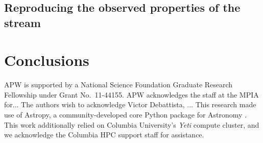 \documentclass[letterpaper,12pt,preprint]{aastex}
\begin{document}
\subsection{Reproducing the observed properties of the stream}\label{sec:results2}

\section{Conclusions}\label{sec:conclusions}


\acknowledgements
APW is supported by a National Science Foundation Graduate Research Fellowship under Grant No.\ 11-44155.
APW acknowledges the staff at the MPIA for...
The authors wish to acknowledge Victor Debattista, ...
This research made use of Astropy, a community-developed core Python package for Astronomy \citep{astropy13}.
This work additionally relied on Columbia University's \emph{Yeti} compute cluster, and we acknowledge the Columbia HPC support staff for assistance. \\



\end{document}
